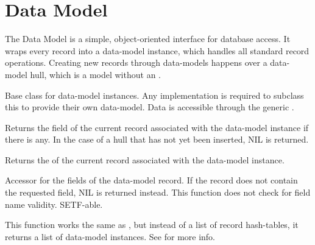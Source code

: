 \section{Data Model}
The Data Model is a simple, object-oriented interface for database access. It wraps every record into a data-model instance, which handles all standard record operations. Creating new records through data-models happens over a data-model hull, which is a model without an .

Base class for data-model instances. Any implementation is required to subclass this to provide their own data-model. Data is accessible through the generic .

Returns the  field of the current record associated with the data-model instance if there is any. In the case of a hull that has not yet been inserted, NIL is returned.

Returns the  of the current record associated with the data-model instance.

Accessor for the fields of the data-model record. If the record does not contain the requested field, NIL is returned instead. This function does not check for field name validity. SETF-able.

This function works the same as , but instead of a list of record hash-tables, it returns a list of data-model instances. See  for more info.

